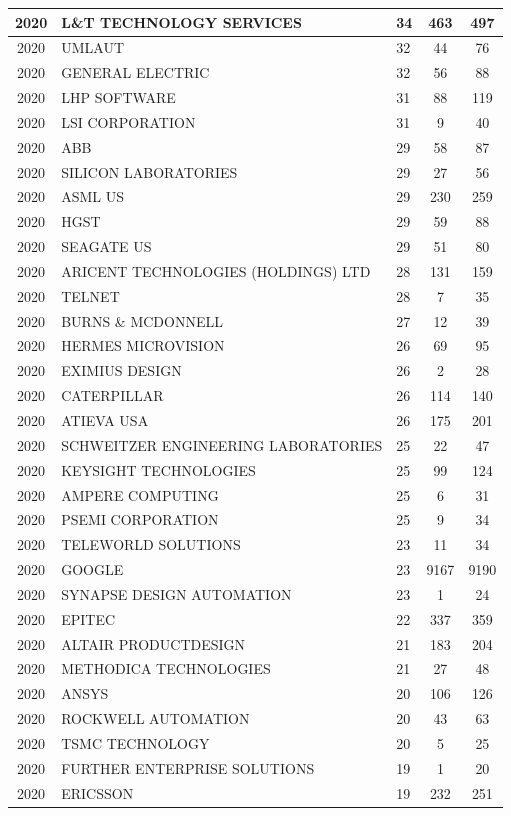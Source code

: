 \documentclass{article}%
\begin{document}
\begin{longtable}{c|p{20em}|p{5em}|c|c}
\hline%
2020&L\&T TECHNOLOGY SERVICES&34&463&497\\%
\hline%
2020&UMLAUT&32&44&76\\%
\hline%
2020&GENERAL ELECTRIC&32&56&88\\%
\hline%
2020&LHP SOFTWARE&31&88&119\\%
\hline%
2020&LSI CORPORATION&31&9&40\\%
\hline%
2020&ABB&29&58&87\\%
\hline%
2020&SILICON LABORATORIES&29&27&56\\%
\hline%
2020&ASML US&29&230&259\\%
\hline%
2020&HGST&29&59&88\\%
\hline%
2020&SEAGATE US&29&51&80\\%
\hline%
2020&ARICENT TECHNOLOGIES (HOLDINGS) LTD&28&131&159\\%
\hline%
2020&TELNET&28&7&35\\%
\hline%
2020&BURNS \& MCDONNELL&27&12&39\\%
\hline%
2020&HERMES MICROVISION&26&69&95\\%
\hline%
2020&EXIMIUS DESIGN&26&2&28\\%
\hline%
2020&CATERPILLAR&26&114&140\\%
\hline%
2020&ATIEVA USA&26&175&201\\%
\hline%
2020&SCHWEITZER ENGINEERING LABORATORIES&25&22&47\\%
\hline%
2020&KEYSIGHT TECHNOLOGIES&25&99&124\\%
\hline%
2020&AMPERE COMPUTING&25&6&31\\%
\hline%
2020&PSEMI CORPORATION&25&9&34\\%
\hline%
2020&TELEWORLD SOLUTIONS&23&11&34\\%
\hline%
2020&GOOGLE&23&9167&9190\\%
\hline%
2020&SYNAPSE DESIGN AUTOMATION&23&1&24\\%
\hline%
2020&EPITEC&22&337&359\\%
\hline%
2020&ALTAIR PRODUCTDESIGN&21&183&204\\%
\hline%
2020&METHODICA TECHNOLOGIES&21&27&48\\%
\hline%
2020&ANSYS&20&106&126\\%
\hline%
2020&ROCKWELL AUTOMATION&20&43&63\\%
\hline%
2020&TSMC TECHNOLOGY&20&5&25\\%
\hline%
2020&FURTHER ENTERPRISE SOLUTIONS&19&1&20\\%
\hline%
2020&ERICSSON&19&232&251\\%

\end{longtable}
\end{document}
